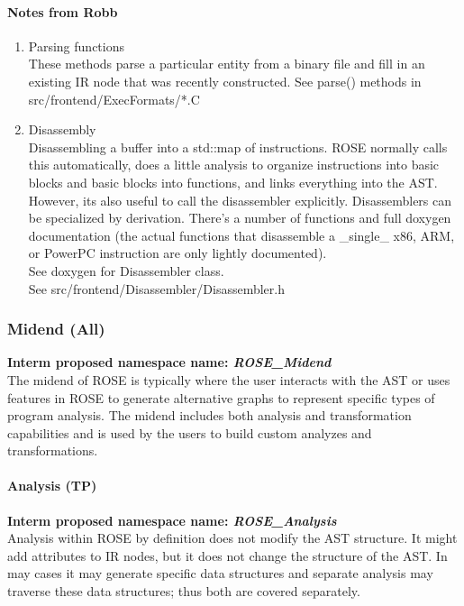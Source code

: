 \paragraph{Notes from Robb}
\begin{enumerate}
	\item Parsing functions \\
   These methods parse a particular entity from a binary file and
   fill in an existing IR node that was recently constructed.
   See parse() methods in src/frontend/ExecFormats/*.C
   \item Disassembly \\
   Disassembling a buffer into a std::map of instructions.  ROSE
   normally calls this automatically, does a little analysis to
   organize instructions into basic blocks and basic blocks into
   functions, and links everything into the AST. However, its
   also useful to call the disassembler explicitly. Disassemblers
   can be specialized by derivation. There's a number of
   functions and full doxygen documentation (the actual functions
   that disassemble a \_single\_ x86, ARM, or PowerPC instruction
   are only lightly documented). \\
   See doxygen for Disassembler class. \\
   See src/frontend/Disassembler/Disassembler.h
\end{enumerate}


\subsubsection{Midend (All)}
{\bf Interm proposed namespace name: {\em ROSE\_Midend}} \\
   The midend of ROSE is typically where the user interacts with the AST
or uses features in ROSE to generate alternative graphs to represent
specific types of program analysis. The midend includes both analysis
and transformation capabilities and is used by the users to build 
custom analyzes and transformations.

\paragraph{Analysis (TP)}
{\bf Interm proposed namespace name: {\em ROSE\_Analysis}} \\
   Analysis within ROSE by definition does not modify the AST structure.
It might add attributes to IR nodes, but it does not change the structure 
of the AST.  In may cases it may generate specific data structures and
separate analysis may traverse these data structures; thus both are covered
separately.

